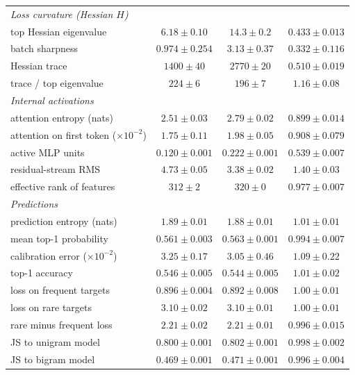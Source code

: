 \begin{center}
\begin{minipage}{\linewidth}
\begin{tabular}{@{}l|cc|c@{}}
\emph{Loss curvature (Hessian $H$)} & & & \\
top Hessian eigenvalue & $6.18 \pm 0.10$ & $14.3 \pm 0.2$ & {\boldmath\textbf{$0.433 \pm 0.013$}} \\
batch sharpness & $0.974 \pm 0.254$ & $3.13 \pm 0.37$ & {\boldmath\textbf{$0.332 \pm 0.116$}} \\
Hessian trace & $1400 \pm 40$ & $2770 \pm 20$ & $0.510 \pm 0.019$ \\
trace / top eigenvalue & $224 \pm 6$ & $196 \pm 7$ & $1.16 \pm 0.08$ \\
\emph{Internal activations} & & & \\
attention entropy (nats) & $2.51 \pm 0.03$ & $2.79 \pm 0.02$ & $0.899 \pm 0.014$ \\
attention on first token ($\times10^{-2}$) & $1.75 \pm 0.11$ & $1.98 \pm 0.05$ & $0.908 \pm 0.079$ \\
active MLP units & $0.120 \pm 0.001$ & $0.222 \pm 0.001$ & $0.539 \pm 0.007$ \\
residual-stream RMS & $4.73 \pm 0.05$ & $3.38 \pm 0.02$ & $1.40 \pm 0.03$ \\
effective rank of features & $312 \pm 2$ & $320 \pm 0$ & $0.977 \pm 0.007$ \\
\emph{Predictions} & & & \\
prediction entropy (nats) & $1.89 \pm 0.01$ & $1.88 \pm 0.01$ & $1.01 \pm 0.01$ \\
mean top-1 probability & $0.561 \pm 0.003$ & $0.563 \pm 0.001$ & $0.994 \pm 0.007$ \\
calibration error ($\times10^{-2}$) & $3.25 \pm 0.17$ & $3.05 \pm 0.46$ & $1.09 \pm 0.22$ \\
top-1 accuracy & $0.546 \pm 0.005$ & $0.544 \pm 0.005$ & $1.01 \pm 0.02$ \\
loss on frequent targets & $0.896 \pm 0.004$ & $0.892 \pm 0.008$ & $1.00 \pm 0.01$ \\
loss on rare targets & $3.10 \pm 0.02$ & $3.10 \pm 0.01$ & $1.00 \pm 0.01$ \\
rare minus frequent loss & $2.21 \pm 0.02$ & $2.21 \pm 0.01$ & $0.996 \pm 0.015$ \\
JS to unigram model & $0.800 \pm 0.001$ & $0.802 \pm 0.001$ & $0.998 \pm 0.002$ \\
JS to bigram model & $0.469 \pm 0.001$ & $0.471 \pm 0.001$ & $0.996 \pm 0.004$ \\
\end{tabular}\end{minipage}
\end{center}

